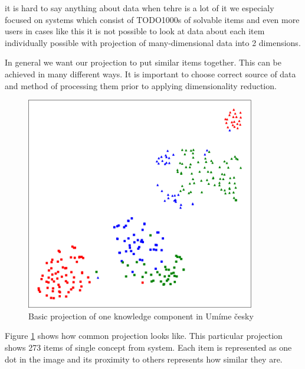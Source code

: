 \documentclass[
  digital, %
  table,   %
  nolof,     %
  nolot,     %
  nocover
]{fithesis3}
\begin{document}



it is hard to say anything about data when tehre is a lot of it we
especialy focused on systems which consist of TODO1000s of solvable
items and even more users in cases like this it is not possible to look
at data about each item individually possible with projection of
many-dimensional data into 2 dimensions.


In general we want our projection to put similar items together. This
can be achieved in many different ways. It is important to choose
correct source of data and method of processing them prior to applying
dimensionality reduction.


\begin{figure}
  \begin{center}
    \includegraphics[width=10cm]{img/common_projection}
  \end{center}
  \caption{Basic projection of one knowledge component in Umíme česky}
  \label{fig:commonprojection}
\end{figure}

Figure \ref{fig:commonprojection} shows how common projection looks
like. This particular projection shows 273 items of single concept from
system. Each item is represented as one dot in the image and its
proximity to others represents how similar they are.
\end{document}
